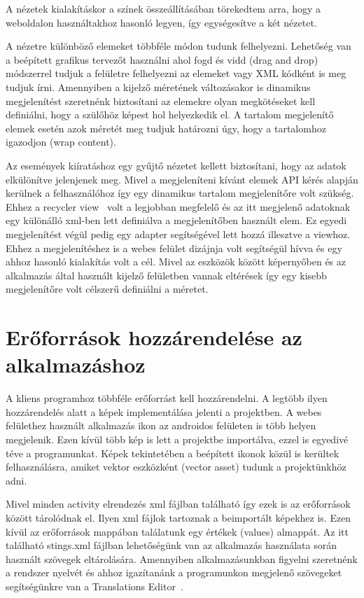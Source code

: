 \documentclass[
]{thesis-ekf}
\theoremstyle{definition}
\theoremstyle{remark}
\begin{document}
	A nézetek kialakításkor a színek összeállításában törekedtem arra, hogy a weboldalon használtakhoz hasonló legyen, így egységesítve a két nézetet. 
	
	A nézetre különböző elemeket többféle módon tudunk felhelyezni. Lehetőség van a beépített grafikus tervezőt használni ahol fogd és vidd (drag and drop) módszerrel tudjuk a felületre felhelyezni az elemeket vagy XML kódként is meg tudjuk írni. Amennyiben a kijelző méretének változásakor is dinamikus megjelenítést szeretnénk biztosítani az elemekre olyan megkötéseket kell definiálni, hogy a szülőhöz képest hol helyezkedik el. A tartalom megjelenítő elemek esetén azok méretét meg tudjuk határozni úgy, hogy a tartalomhoz igazodjon (wrap content).
	
	Az események kiíratáshoz egy gyűjtő nézetet kellett biztosítani, hogy az adatok elkülönítve jelenjenek meg. Mivel a megjeleníteni kívánt elemek API kérés alapján kerülnek a felhasználóhoz így egy dinamikus tartalom megjelenítőre volt szükség. Ehhez a recycler view~\cite{android_recycler} volt a legjobban megfelelő és az itt megjelenő adatoknak egy különálló xml-ben lett definiálva a megjelenítőben használt elem. Ez egyedi megjelenítést végül pedig egy adapter segítségével lett hozzá illesztve a viewhoz. Ehhez a megjelenítéshez is a webes felület dizájnja volt segítségül hívva és egy ahhoz hasonló kialakítás volt a cél. Mivel az eszközök között képernyőben és az alkalmazás által használt kijelző felületben vannak eltérések így egy kisebb megjelenítőre volt célszerű definiálni a méretet.
	
	\section{Erőforrások hozzárendelése az alkalmazáshoz}
	A kliens programhoz többféle erőforrást kell hozzárendelni. A legtöbb ilyen hozzárendelés alatt a képek implementálása jelenti a projektben. A webes felülethez használt alkalmazás ikon az androidos felületen is több helyen megjelenik. Ezen kívül több kép is lett a projektbe importálva, ezzel is egyedivé téve a programunkat. Képek tekintetében a beépített ikonok közül is kerültek felhasználásra, amiket vektor eszközként (vector asset) tudunk a projektünkhöz adni.
	
	Mivel minden activity elrendezés xml fájlban található így ezek is az erőforrások között tárolódnak el. Ilyen xml fájlok tartoznak a beimportált képekhez is. Ezen kívül az erőforrások mappában találatunk egy értékek (values) almappát. Az itt található stings.xml fájlban lehetőségünk van az alkalmazás használata során használt szövegek eltárolására. Amennyiben alkalmazásunkban figyelni szeretnénk a rendszer nyelvét és ahhoz igazítanánk a programunkon megjelenő szövegeket segítségünkre van a Translations Editor~\cite{android_translations}. 
	
\end{document}
